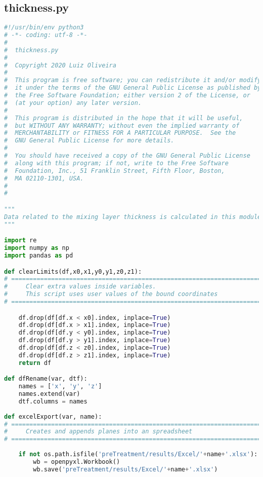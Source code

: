 \subsection{thickness.py}
\begin{lstlisting}[language=python]
#!/usr/bin/env python3
# -*- coding: utf-8 -*-
#
#  thickness.py
#  
#  Copyright 2020 Luiz Oliveira
#  
#  This program is free software; you can redistribute it and/or modify
#  it under the terms of the GNU General Public License as published by
#  the Free Software Foundation; either version 2 of the License, or
#  (at your option) any later version.
#  
#  This program is distributed in the hope that it will be useful,
#  but WITHOUT ANY WARRANTY; without even the implied warranty of
#  MERCHANTABILITY or FITNESS FOR A PARTICULAR PURPOSE.  See the
#  GNU General Public License for more details.
#  
#  You should have received a copy of the GNU General Public License
#  along with this program; if not, write to the Free Software
#  Foundation, Inc., 51 Franklin Street, Fifth Floor, Boston,
#  MA 02110-1301, USA.
#  
#  

"""
Data related to the mixing layer thickness is calculated in this module
"""

import re
import numpy as np
import pandas as pd

def clearLimits(df,x0,x1,y0,y1,z0,z1):
# =============================================================================
#     Clear extra values inside variables.
#     This script uses user values of the bound coordinates
# =============================================================================

    df.drop(df[df.x < x0].index, inplace=True)
    df.drop(df[df.x > x1].index, inplace=True)
    df.drop(df[df.y < y0].index, inplace=True)
    df.drop(df[df.y > y1].index, inplace=True)
    df.drop(df[df.z < z0].index, inplace=True)
    df.drop(df[df.z > z1].index, inplace=True)
    return df

def dfRename(var, dtf):
    names = ['x', 'y', 'z']
    names.extend(var)
    dtf.columns = names
    
def excelExport(var, name):
# =============================================================================
#     Creates and appends planes into an spreadsheet
# =============================================================================
    
    if not os.path.isfile('preTreatment/results/Excel/'+name+'.xlsx'):
        wb = openpyxl.Workbook()
        wb.save('preTreatment/results/Excel/'+name+'.xlsx')


\end{lstlisting}
